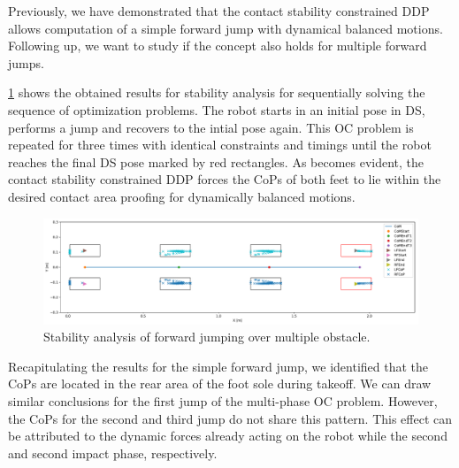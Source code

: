 Previously, we have demonstrated that the contact stability constrained \gls{DDP} allows computation of a simple forward jump with dynamical balanced motions. Following up, we want to study if the concept also holds for multiple forward jumps. 

\cref{fig:jumpObstacles_StabilityAnalysis} shows the obtained results for stability analysis for sequentially solving the sequence of optimization problems. The robot starts in an initial pose in \gls{DS}, performs a jump and recovers to the intial pose again. This \gls{OC} problem is repeated for three times with identical constraints and timings until the robot reaches the final \gls{DS} pose marked by red rectangles. As becomes evident, the contact stability constrained \gls{DDP} forces the \gls{CoP}s of both feet to lie within the desired contact area proofing for dynamically balanced motions. 

\begin{figure}[h!]
\centering	
\includegraphics[width=1\textwidth]{fig/jumpObstacles/StabilityAnalysis}
\caption{Stability analysis of forward jumping over multiple obstacle.}
\label{fig:jumpObstacles_StabilityAnalysis}
\end{figure}

Recapitulating the results for the simple forward jump, we identified that the \gls{CoP}s are located in the rear area of the foot sole during takeoff. We can draw similar conclusions for the first jump of the multi-phase \gls{OC} problem. However, the \gls{CoP}s for the second and third jump do not share this pattern. This effect can be attributed to the dynamic forces already acting on the robot while the second and second impact phase, respectively.


